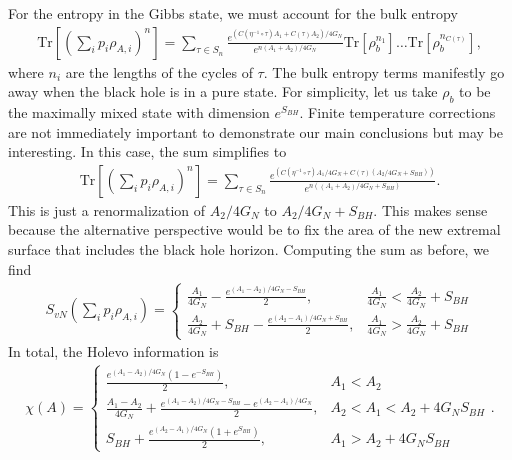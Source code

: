 \documentclass[a4paper,11pt]{article}
\newcommand{\Tr}{\text{Tr}}
\newcommand*{\SR}[1]{\textcolor{magenta}{[SR: \textsf{#1}]}}
\begin{document}
For the entropy in the Gibbs state, we must account for the bulk entropy
\begin{align}
    \Tr\left[ \left(\sum_i p_i\rho_{A,i} \right)^{n}\right]= \sum_{\tau \in  S_{n}}\frac{e^{\left(C(\eta^{-1} \circ \tau) A_1 + C(\tau) A_2\right)/4G_N}}{e^{n( A_1+A_2)/4G_N }}\Tr\left[\rho_b^{n_1}\right]\dots\Tr\left[\rho_b^{n_{C(\tau)}}\right],
\end{align}
where $n_i$ are the lengths of the cycles of $\tau$. The bulk entropy terms manifestly go away when the black hole is in a pure state. For simplicity, let us take $\rho_b$ to be the maximally mixed state with dimension $e^{S_{BH}}$. Finite temperature corrections are not immediately important to demonstrate our main conclusions but may be interesting. In this case, the sum simplifies to 
\begin{align}
    \Tr\left[ \left(\sum_i p_i\rho_{A,i} \right)^{n}\right]= \sum_{\tau \in  S_{n}}\frac{e^{\left(C(\eta^{-1} \circ \tau) A_1/4G_N + C(\tau) (A_2/4G_N+S_{BH})\right)}}{e^{n(( A_1+A_2)/4G_N + S_{BH})}}.
\end{align}
This is just a renormalization of $A_2/4G_N$ to  $A_2/4G_N + S_{BH}$. This makes sense because the alternative perspective would be to fix the area of the new extremal surface that includes the black hole horizon. Computing the sum as before, we find
\begin{align}
    S_{vN} \left(\sum_i p_i\rho_{A,i} \right) = \begin{cases}
    \frac{A_{1}}{4G_N}  -\frac{e^{(A_{1} - A_{2})/4G_N-S_{BH}}}{2}, & \frac{A_{1}}{4G_N} < \frac{A_{2}}{4G_N} + S_{BH}
    \\
    \frac{A_{2}}{4G_N} + S_{BH} -\frac{e^{(A_{2} - A_{1})/4G_N+S_{BH}}}{2}, & \frac{A_{1}}{4G_N} > \frac{A_{2}}{4G_N} + S_{BH}
    \end{cases}
\end{align}
In total, the Holevo information is
\begin{align}
    \chi(A) = \begin{cases}
    \frac{e^{(A_{1} - A_{2})/4G_N}(1-e^{-S_{BH}})}{2} , & A_1 < A_2
    \\
    \frac{A_1 - A_2}{4G_N} + \frac{e^{(A_{1} - A_{2})/4G_N-S_{BH}}-e^{(A_{2} - A_{1})/4G_N}}{2}, & A_2 < A_1 < A_2 + 4G_NS_{BH}
    \\
    S_{BH}+\frac{e^{(A_{2} - A_{1})/4G_N}(1+e^{S_{BH}})}{2} ,& A_1 > A_2 + 4G_NS_{BH}
    \end{cases}.
\end{align}
\end{document}
